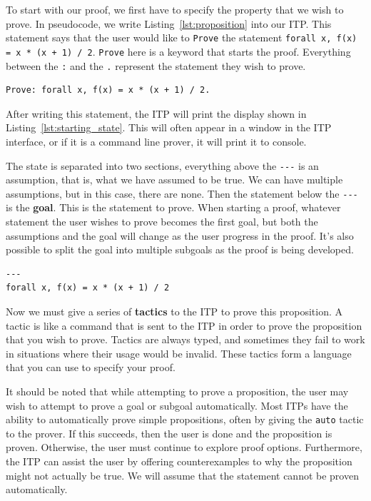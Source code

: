 \documentclass[
]{article}
\newcommand{\passthrough}[1]{#1}
\begin{document}
To start with our proof, we first have to specify the property that we
wish to prove. In pseudocode, we write Listing~\ref{lst:proposition}
into our ITP. This statement says that the user would like to
\passthrough{\lstinline!Prove!} the statement
\passthrough{\lstinline!forall x, f(x) = x * (x + 1) / 2!}.
\passthrough{\lstinline!Prove!} here is a keyword that starts the proof.
Everything between the \passthrough{\lstinline!:!} and the
\passthrough{\lstinline!.!} represent the statement they wish to prove.

\begin{lstlisting}[caption={User Input: Statement of the proposition to prove}, label=lst:proposition]
Prove: forall x, f(x) = x * (x + 1) / 2.
\end{lstlisting}

After writing this statement, the ITP will print the display shown in
Listing~\ref{lst:starting_state}. This will often appear in a window in
the ITP interface, or if it is a command line prover, it will print it
to console.

The state is separated into two sections, everything above the
\passthrough{\lstinline!---!} is an assumption, that is, what we have
assumed to be true. We can have multiple assumptions, but in this case,
there are none. Then the statement below the
\passthrough{\lstinline!---!} is the \textbf{goal}. This is the
statement to prove. When starting a proof, whatever statement the user
wishes to prove becomes the first goal, but both the assumptions and the
goal will change as the user progress in the proof. It's also possible
to split the goal into multiple subgoals as the proof is being
developed.

\begin{lstlisting}[caption={ITP Output: Starting state}, label=lst:starting_state]
---
forall x, f(x) = x * (x + 1) / 2
\end{lstlisting}

Now we must give a series of \textbf{tactics} to the ITP to prove this
proposition. A tactic is like a command that is sent to the ITP in order
to prove the proposition that you wish to prove. Tactics are always
typed, and sometimes they fail to work in situations where their usage
would be invalid. These tactics form a language that you can use to
specify your proof.

It should be noted that while attempting to prove a proposition, the
user may wish to attempt to prove a goal or subgoal automatically. Most
ITPs have the ability to automatically prove simple propositions, often
by giving the \passthrough{\lstinline!auto!} tactic to the prover. If
this succeeds, then the user is done and the proposition is proven.
Otherwise, the user must continue to explore proof options. Furthermore,
the ITP can assist the user by offering counterexamples to why the
proposition might not actually be true. We will assume that the
statement cannot be proven automatically.
\end{document}
